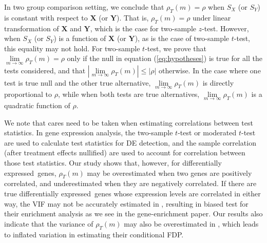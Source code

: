 \documentclass[12pt, a4paper]{article}
\newcommand{\DED}{differentially expressed}
\newcommand{\genesetpaper}{the gene-enrichment paper}
\begin{document}
	In two group comparison setting, we conclude that $\rho_T(m) = \rho$ when $S_X$ (or $S_Y$) is 
	constant with respect to $\bm X$ (or $\bm Y$). That is, $\rho_T(m) = \rho$ under linear 
	transformation of $\bm X$ and $\bm Y$, which is the case for two-sample $z$-test. However, when 
	$S_X$ (or $S_Y$) is a function of $\bm X$ (or $\bm Y$), as is the case of two-sample $t$-test, 
	this 
	equality may not hold. For two-sample $t$-test, we prove that 
	$\lim\limits_{m\rightarrow\infty}\rho_T(m)=\rho$ only if the null in equation 
	(\ref{eq:hypotheses}) 
	is true for all the tests 
	considered, and that $|\lim\limits_{m\rightarrow\infty}\rho_T(m)|\leq |\rho|$ otherwise. In the 
	case where one test is true null 
	and the other true alternative, $\lim\limits_{m\rightarrow\infty}\rho_T(m)$ is directly 
	proportional to $\rho$, while when both 
	tests are true alternatives, $\lim\limits_{m\rightarrow\infty}\rho_T(m)$ is a quadratic 
	function of 
	$\rho$.
	
	We note that cares need to be taken when estimating correlations between test statistics.
	In gene expression analysis, the two-sample $t$-test \citep{barry2008statistical, 
		efron2007correlation,qiu2005correlation} or moderated 
	$t$-test \citep{wu2012camera} are used to calculate test statistics for DE detection, and the 
	sample correlation (after treatment effects 
	nullified) are used to account for correlation between those test statistics.
	Our study shows that, however, for \DED~genes, $\rho_T(m)$ may be 
	overestimated when
	two genes are positively correlated, and underestimated when they are negatively correlated. If 
	there are true \DED~genes whose expression 
	levels are correlated in either way, the VIF may not be accurately estimated in 
	\citet{wu2012camera}, resulting in biased test
	for their enrichment analysis as we see in \genesetpaper. Our results also indicate 
	that the variance of 
	$\rho_T(m)$ may also be overestimated in
	\citet{efron2007correlation}, which leads to inflated variation in estimating their conditional 
	FDP.
	
\end{document}
